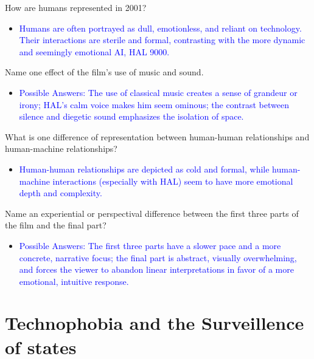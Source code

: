 \documentclass[11pt,fleqn]{book} %
\begin{document}
\begin{exercise}
How are humans represented in 2001?
\begin{itemize}
\item \textcolor{blue}{Humans are often portrayed as dull, emotionless, and reliant on technology.  Their interactions are sterile and formal, contrasting  with the more dynamic and seemingly emotional AI, HAL 9000.}
\end{itemize}
\end{exercise}

\begin{exercise}
Name one effect of the film's use of music and sound.
\begin{itemize}
\item \textcolor{blue}{Possible Answers: The use of classical music creates a sense of grandeur or irony; HAL's calm voice makes him seem  ominous; the contrast between silence and diegetic sound emphasizes the isolation of space.}
\end{itemize}
\end{exercise}

\begin{exercise}
What is one difference of representation between human-human relationships and human-machine relationships?
\begin{itemize}
\item \textcolor{blue}{Human-human relationships are depicted as cold and formal, while human-machine interactions (especially with HAL) seem to have more emotional depth and complexity.}
\end{itemize}
\end{exercise}

\begin{exercise}
Name an experiential or perspectival difference between the first three parts of the film and the final part?
\begin{itemize}
\item \textcolor{blue}{Possible Answers:  The first three parts have a slower pace and a more concrete, narrative focus;  the final part is abstract, visually overwhelming, and forces the viewer to abandon linear interpretations in favor of  a more emotional, intuitive response.}
\end{itemize}
\end{exercise}



\section{Technophobia and the Surveillence of states}
\end{document}

